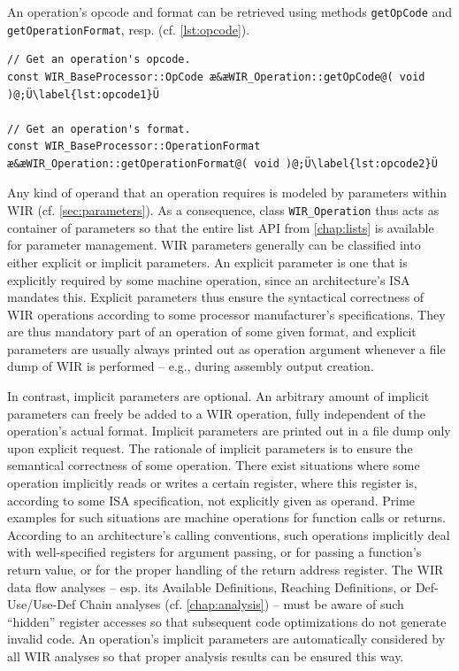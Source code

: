 An operation's opcode and format can be retrieved using methods \texttt{getOpCode} and \texttt{getOperationFormat}, resp. (cf. \cref{lst:opcode}).

\begin{lstlisting}[style=code,float=t,caption={Opcode and Format Handling of Class \texttt{WIR\_Operation}},label=lst:opcode]
// Get an operation's opcode.
const WIR_BaseProcessor::OpCode æ&æWIR_Operation::getOpCode@( void )@;Ü\label{lst:opcode1}Ü

// Get an operation's format.
const WIR_BaseProcessor::OperationFormat æ&æWIR_Operation::getOperationFormat@( void )@;Ü\label{lst:opcode2}Ü
\end{lstlisting}

Any kind of operand that an operation requires is modeled by parameters within \gls{WIR} (cf. \cref{sec:parameters}).
As a consequence, class \texttt{WIR\_Operation} thus acts as container of parameters so that the entire list \gls{API} from \cref{chap:lists} is available for parameter management.
\gls{WIR} parameters generally can be classified into either explicit or implicit parameters.
An explicit parameter is one that is explicitly required by some machine operation, since an architecture's \gls{ISA} mandates this.
Explicit parameters thus ensure the syntactical correctness of \gls{WIR} operations according to some processor manufacturer's specifications.
They are thus mandatory part of an operation of some given format, and explicit parameters are usually always printed out as operation argument whenever a file dump of \gls{WIR} is performed -- e.g., during assembly output creation.

In contrast, implicit parameters are optional.
An arbitrary amount of implicit parameters can freely be added to a \gls{WIR} operation, fully independent of the operation's actual format.
Implicit parameters are printed out in a file dump only upon explicit request.
The rationale of implicit parameters is to ensure the semantical correctness of some operation.
There exist situations where some operation implicitly reads or writes a certain register, where this register is, according to some \gls{ISA} specification, not explicitly given as operand.
Prime examples for such situations are machine operations for function calls or returns.
According to an architecture's calling conventions, such operations implicitly deal with well-specified registers for argument passing, or for passing a function's return value, or for the proper handling of the return address register.
The \gls{WIR} data flow analyses -- esp. its Available Definitions, Reaching Definitions, or Def-Use/Use-Def Chain analyses (cf. \cref{chap:analysis}) -- must be aware of such ``hidden'' register accesses so that subsequent code optimizations do not generate invalid code.
An operation's implicit parameters are automatically considered by all \gls{WIR} analyses so that proper analysis results can be ensured this way.

